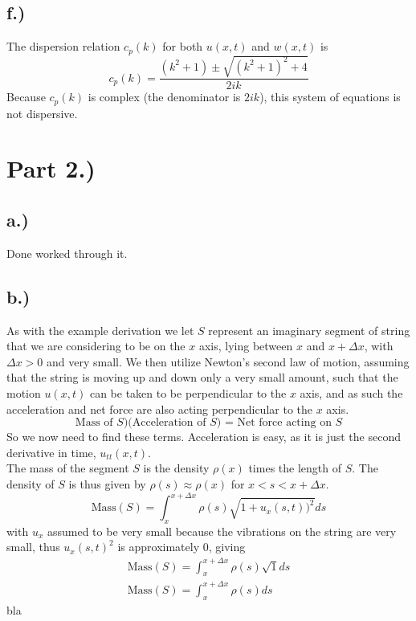 \documentclass{article}
\begin{document}
\subsection*{f.)}
The dispersion relation $c_p(k)$ for both $u(x,t)$ and $w(x, t)$ is 
\begin{equation}
c_p(k) = \frac{(k^2 + 1) \pm \sqrt{(k^2 + 1)^2 +4}}{2ik}
\end{equation}
Because $c_p(k)$ is complex (the denominator is $2ik$), this system of equations is not dispersive. 
\section*{Part 2.)}
\subsection*{a.)}
Done worked through it.
\subsection*{b.)}
As with the example derivation we let $S$ represent an imaginary segment of string that we are considering to be on the $x$ axis, lying between $x$ and $x + \Delta x$, with $\Delta x >0$ and very small. We then utilize Newton's second law of motion, assuming that the string is moving up and down only a very small amount, such that the motion $u(x, t)$ can be taken to be perpendicular to the $x$ axis, and as such the acceleration and net force are also acting perpendicular to the $x$ axis.
\begin{equation}
\text{Mass of $S$)(Acceleration of $S$) = Net force acting on $S$}
\end{equation}
So we now need to find these terms. Acceleration is easy, as it is just the second derivative in time, $u_{tt}(x, t)$. \\
\indent The mass of the segment $S$ is the density $\rho(x)$ times the length of $S$. The density of $S$ is thus given by $\rho (s) \approx \rho (x)$ for $x < s < x + \Delta x$.
\begin{equation}
\text{Mass} (S) = \int_{x}^{x + \Delta x} \rho (s) \sqrt{1 + u_x(s,t))^2}ds
\end{equation}
with $u_x$ assumed to be very small because the vibrations on the string are very small, thus $u_x(s,t)^2$ is approximately $0$, giving
\begin{equation}
\begin{aligned}
\text{Mass} (S) = \int_{x}^{x + \Delta x} \rho (s) \sqrt{1}ds\\
\text{Mass} (S) = \int_{x}^{x + \Delta x} \rho (s)ds
\end{aligned}
\end{equation}
bla
\end{document}
